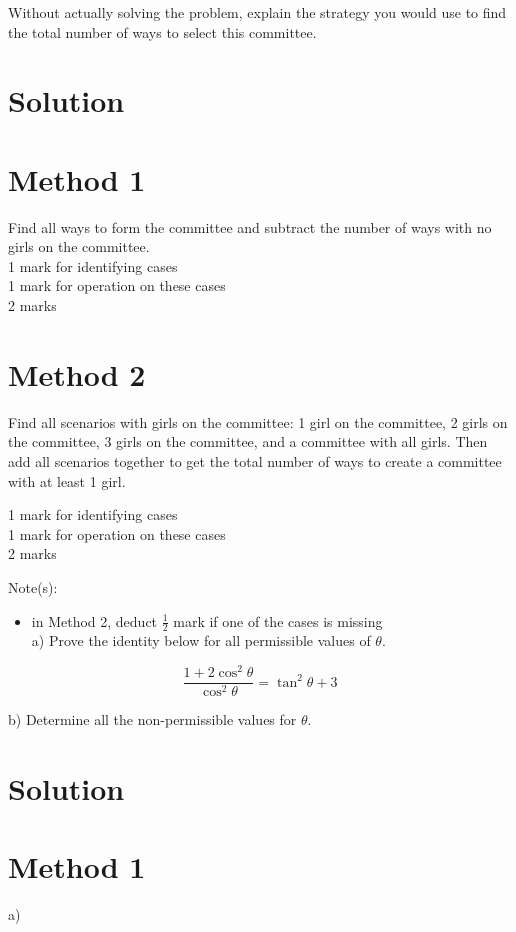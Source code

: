 \documentclass[10pt]{article}
\begin{document}
Without actually solving the problem, explain the strategy you would use to find the total number of ways to select this committee.

\section*{Solution}
\section*{Method 1}
Find all ways to form the committee and subtract the number of ways with no girls on the committee.\\
1 mark for identifying cases\\
1 mark for operation on these cases\\
2 marks

\section*{Method 2}
Find all scenarios with girls on the committee: 1 girl on the committee, 2 girls on the committee, 3 girls on the committee, and a committee with all girls. Then add all scenarios together to get the total number of ways to create a committee with at least 1 girl.

1 mark for identifying cases\\
1 mark for operation on these cases\\
2 marks

Note(s):

\begin{itemize}
  \item in Method 2, deduct $\frac{1}{2}$ mark if one of the cases is missing\\
a) Prove the identity below for all permissible values of $\theta$.
\end{itemize}

$$
\frac{1+2 \cos ^{2} \theta}{\cos ^{2} \theta}=\tan ^{2} \theta+3
$$

b) Determine all the non-permissible values for $\theta$.

\section*{Solution}
\section*{Method 1}
a)
\end{document}
